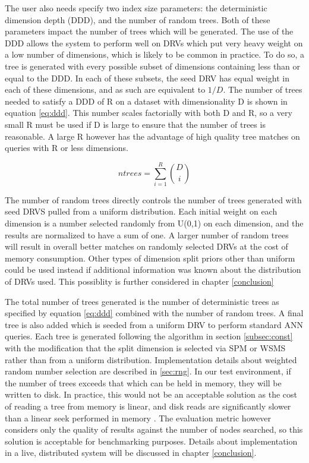 The user also needs specify two index size parameters: the deterministic dimension depth (DDD), and the number of random trees.  Both of these parameters impact the number of trees which will be generated.  The use of the DDD allows the system to perform well on DRVs which put very heavy weight on a low number of dimensions, which is likely to be common in practice.  To do so, a tree is generated with every possible subset of dimensions containing less than or equal to the DDD.  In each of these subsets, the seed DRV has equal weight in each of these dimensions, and as such are equivalent to $1/D$.  The number of trees needed to satisfy a DDD of R on a dataset with dimensionality D is shown in equation \ref{eq:ddd}.  This number scales factorially with both D and R, so a very small R must be used if D is large to ensure that the number of trees is reasonable.  A large R however has the advantage of high quality tree matches on queries with R or less dimensions.

\begin{equation}
\label{eq:ddd}
ntrees = \sum\limits_{i=1}^R {D \choose i}
\end{equation}

The number of random trees directly controls the number of trees generated with seed DRVS pulled from a uniform distribution.  Each initial weight on each dimension is a number selected randomly from U(0,1) on each dimension, and the results are normalized to have a sum of one.  A larger number of random trees will result in overall better matches on randomly selected DRVs at the cost of memory consumption.  Other types of dimension split priors other than uniform could be used instead if additional information was known about the distribution of DRVs used.  This possiblity is further considered in chapter \ref{conclusion}

The total number of trees generated is the number of deterministic trees as specified by equation \ref{eq:ddd} combined with the number of random trees.  A final tree is also added which is seeded from a uniform DRV to perform standard ANN queries.  Each tree is generated following the algorithm in section \ref{subsec:const} with the modification that the split dimension is selected via SPM or WSMS rather than from a uniform distribution.  Implementation details about weighted random number selection are described in \ref{sec:rng}.  In our test environment, if the number of trees exceeds that which can be held in memory, they will be written to disk.  In practice, this would not be an acceptable solution as the cost of reading a tree from memory is linear, and disk reads are significantly slower than a linear seek performed in memory \citep{ousterhout1989beating}.  The evaluation metric however considers only the quality of results against the number of nodes searched, so this solution is acceptable for benchmarking purposes.  Details about implementation in a live, distributed system will be discussed in chapter \ref{conclusion}.


